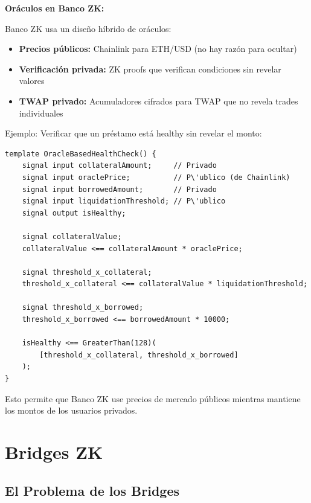 \documentclass[11pt,a4paper,twoside]{book}
\begin{document}
\begin{bancozk}
\textbf{Or\'aculos en Banco ZK:}

Banco ZK usa un dise\~no h\'ibrido de or\'aculos:

\begin{itemize}
    \item \textbf{Precios p\'ublicos:} Chainlink para ETH/USD (no hay raz\'on para ocultar)
    \item \textbf{Verificaci\'on privada:} ZK proofs que verifican condiciones sin revelar valores
    \item \textbf{TWAP privado:} Acumuladores cifrados para TWAP que no revela trades individuales
\end{itemize}

Ejemplo: Verificar que un pr\'estamo est\'a healthy sin revelar el monto:
\begin{verbatim}
template OracleBasedHealthCheck() {
    signal input collateralAmount;     // Privado
    signal input oraclePrice;          // P\'ublico (de Chainlink)
    signal input borrowedAmount;       // Privado
    signal input liquidationThreshold; // P\'ublico
    signal output isHealthy;
    
    signal collateralValue;
    collateralValue <== collateralAmount * oraclePrice;
    
    signal threshold_x_collateral;
    threshold_x_collateral <== collateralValue * liquidationThreshold;
    
    signal threshold_x_borrowed;
    threshold_x_borrowed <== borrowedAmount * 10000;
    
    isHealthy <== GreaterThan(128)(
        [threshold_x_collateral, threshold_x_borrowed]
    );
}
\end{verbatim}

Esto permite que Banco ZK use precios de mercado p\'ublicos mientras mantiene los montos de los usuarios privados.
\end{bancozk}

\section{Bridges ZK}
\label{sec:zkbridges}

\subsection{El Problema de los Bridges}
\end{document}
